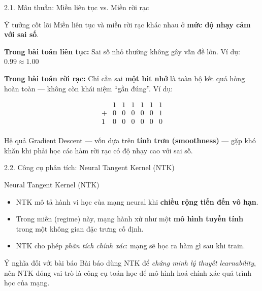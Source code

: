 \documentclass[10pt, aspectratio=169]{beamer}
\begin{document}
\begin{frame}{2.1. Mâu thuẫn: Miền liên tục vs. Miền rời rạc}

    \begin{block}{Ý tưởng cốt lõi}
        Miền liên tục và miền rời rạc khác nhau ở \textbf{mức độ nhạy cảm với sai số}.
    \end{block}

    \vspace{1em}

    \textbf{Trong bài toán liên tục:}  
    Sai số nhỏ thường không gây vấn đề lớn. Ví dụ: $0.99 \approx 1.00$

    \vspace{0.5em}

    \textbf{Trong bài toán rời rạc:}  
    Chỉ cần sai \textbf{một bit nhớ} là toàn bộ kết quả hỏng hoàn toàn — không còn khái niệm “gần đúng”. Ví dụ:

\[
\begin{array}{ccccccc}
    & 1 & 1 & 1 & 1 & 1 & 1 \\
    + & 0 & 0 & 0 & 0 & 0 & 1 \\
    \hline
    1 & 0 & 0 & 0 & 0 & 0 & 0 \\
\end{array}
\]

    \vspace{0.2em}

    \begin{block}{Hệ quả}
        Gradient Descent — vốn dựa trên \textbf{tính trơn (smoothness)} — gặp khó khăn khi phải học các hàm rời rạc có độ nhạy cao với sai số.
    \end{block}

\end{frame}

\begin{frame}{2.2. Công cụ phân tích: Neural Tangent Kernel (NTK)}

\begin{block}{Neural Tangent Kernel (NTK)}
    \begin{itemize}
        \item NTK mô tả hành vi học của mạng neural khi \textbf{chiều rộng tiến đến vô hạn}.
        \item Trong miền (regime) này, mạng hành xử như một \textbf{mô hình tuyến tính} trong một không gian đặc trưng cố định.
        \item NTK cho phép \textit{phân tích chính xác}: mạng sẽ học ra hàm gì sau khi train.
    \end{itemize}
\end{block}

\vspace{0.7em}

\begin{block}{Ý nghĩa đối với bài báo}
    Bài báo dùng NTK để \textit{chứng minh lý thuyết learnability}, nên NTK đóng vai trò là công cụ toán học để mô hình hoá chính xác quá trình học của mạng.
\end{block}

\end{frame}
\end{document}
